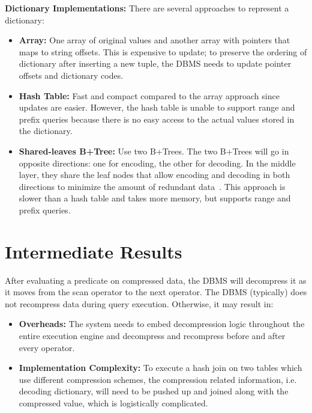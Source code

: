 \documentclass[11pt]{article}
\begin{document}
\textbf{Dictionary Implementations:} There are several approaches to represent a dictionary:
\begin{itemize}
    \item \textbf{Array:}
    One array of original values and another array with pointers that maps to
    string offsets. This is expensive to update; to preserve the ordering of dictionary after
    inserting a new tuple, the DBMS needs to update pointer offsets and dictionary codes.

    \item \textbf{Hash Table:}
    Fast and compact compared to the array approach since updates are
    easier. However, the hash table is unable to support range and prefix queries because there is
    no easy access to the actual values stored in the dictionary.

    \item \textbf{Shared-leaves B+Tree:}
    Use two B+Trees. The two B+Trees will go in opposite
    directions: one for encoding, the other for decoding. In the middle layer, they share the leaf
    nodes that allow encoding and decoding in both directions to minimize the amount of redundant
    data~\cite{p283-binnig}. This approach is slower than a hash table and takes more memory, but
    supports range and prefix queries.
\end{itemize}

\section{Intermediate Results}
After evaluating a predicate on compressed data,
the DBMS will decompress it as it moves from the
scan operator to the next operator. The DBMS (typically) does not recompress data during query
execution. Otherwise, it may result in:

\begin{itemize}
    \item \textbf{Overheads:}
    The system needs to embed decompression logic throughout the entire
    execution engine and decompress and recompress before and after every operator.

    \item \textbf{Implementation Complexity:}
    To execute a hash join on two tables which use different compression schemes, the compression
    related information, i.e. decoding dictionary, will need to be pushed up and joined along with
    the compressed value, which is logistically complicated.
\end{itemize}
\end{document}
